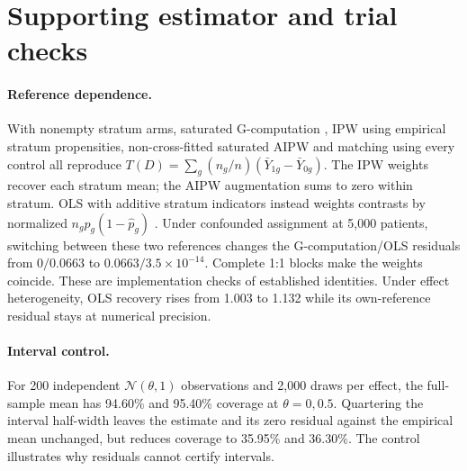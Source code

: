 \section{Supporting estimator and trial checks}
\label{app:matrix}\label{sec:matrix}

\paragraph{Reference dependence.}
With nonempty stratum arms, saturated G-computation \citep{robins1986}, IPW
using empirical stratum propensities, non-cross-fitted saturated AIPW and
matching using every control all reproduce
$T(D)=\sum_g(n_g/n)(\bar Y_{1g}-\bar Y_{0g})$. The IPW weights recover each
stratum mean; the AIPW augmentation sums to zero within stratum. OLS with
additive stratum indicators instead weights contrasts by normalized
$n_g\hat p_g(1-\hat p_g)$ \citep{angrist1998,frisch1933}. Under confounded
assignment at 5{,}000 patients, switching between these two references changes
the G-computation/OLS residuals from $0/0.0663$ to $0.0663/3.5\times10^{-14}$.
Complete 1:1 blocks make the weights coincide. These are implementation checks
of established identities. Under effect heterogeneity, OLS recovery rises
from 1.003 to 1.132 while its own-reference residual stays at numerical precision.

\paragraph{Interval control.}
For 200 independent $\mathcal N(\theta,1)$ observations and 2{,}000 draws per
effect, the full-sample mean has 94.60\% and 95.40\% coverage at
$\theta=0,0.5$. Quartering the interval half-width leaves the estimate and its
zero residual against the empirical mean unchanged, but reduces coverage to
35.95\% and 36.30\%. The control illustrates why residuals cannot certify
intervals.\label{tab:cleancontrol}

